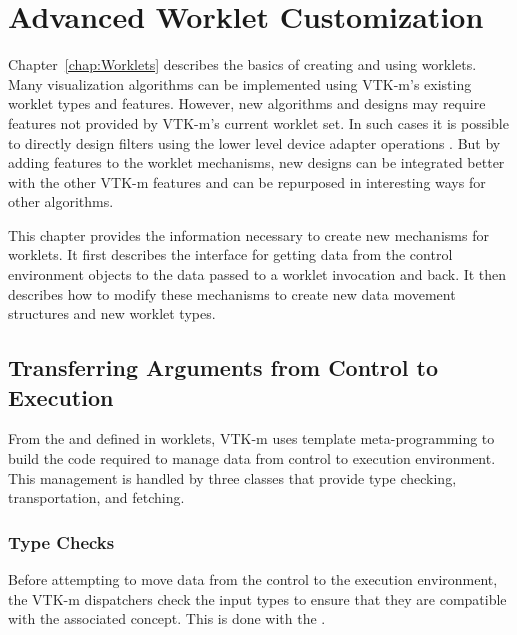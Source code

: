 
\chapter{Advanced Worklet Customization}
\label{chap:AdvancedWorklets}

Chapter~\ref{chap:Worklets} describes the basics of creating and using
worklets. Many visualization algorithms can be implemented using VTK-m's
existing worklet types and features. However, new algorithms and designs
may require features not provided by VTK-m's current worklet set. In such
cases it is possible to directly design filters using the lower level
device adapter operations . But by adding
features to the worklet mechanisms, new designs can be integrated better
with the other VTK-m features and can be repurposed in interesting ways for
other algorithms.

This chapter provides the information necessary to create new mechanisms
for worklets. It first describes the interface for getting data from the
control environment objects to the data passed to a worklet invocation and
back. It then describes how to modify these mechanisms to create new data
movement structures and new worklet types.

\section{Transferring Arguments from Control to Execution}
\label{sec:TransferringArguments}

From the \controlsignature and \executionsignature defined in worklets,
VTK-m uses template meta-programming to build the code required to manage
data from control to execution environment. This management is handled by
three classes that provide type checking, transportation, and fetching.


\subsection{Type Checks}
\label{sec:TypeChecks}


Before attempting to move data from the control to the execution
environment, the VTK-m dispatchers check the input types to ensure that
they are compatible with the associated \controlsignature concept. This is
done with the  .


